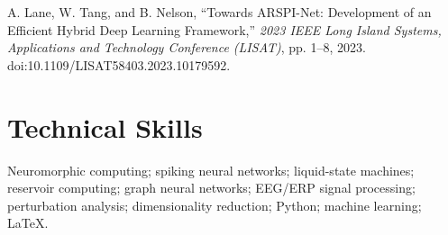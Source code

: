 \documentclass[10pt]{article}
\newcommand{\pub}[1]{\noindent\hangindent=0.35cm #1\par\vspace{2pt}}
\begin{document}
\pub{A. Lane, W. Tang, and B. Nelson, ``Towards ARSPI-Net: Development of an Efficient Hybrid Deep Learning Framework,'' \textit{2023 IEEE Long Island Systems, Applications and Technology Conference (LISAT)}, pp. 1--8, 2023. doi:10.1109/LISAT58403.2023.10179592.}

\section*{Technical Skills}
Neuromorphic computing; spiking neural networks; liquid-state machines; reservoir computing; graph neural networks; EEG/ERP signal processing; perturbation analysis; dimensionality reduction; Python; machine learning; LaTeX.
\end{document}
